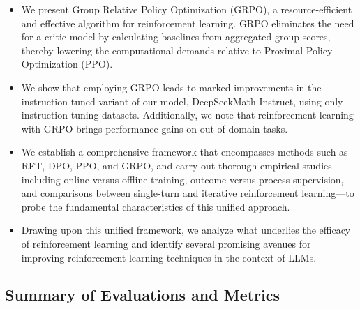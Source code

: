 \begin{itemize}[topsep=0pt]
    \item We present Group Relative Policy Optimization (GRPO), a resource-efficient and effective algorithm for reinforcement learning. GRPO eliminates the need for a critic model by calculating baselines from aggregated group scores, thereby lowering the computational demands relative to Proximal Policy Optimization (PPO).
    \item We show that employing GRPO leads to marked improvements in the instruction-tuned variant of our model, DeepSeekMath-Instruct, using only instruction-tuning datasets. Additionally, we note that reinforcement learning with GRPO brings performance gains on out-of-domain tasks.
    \item We establish a comprehensive framework that encompasses methods such as RFT, DPO, PPO, and GRPO, and carry out thorough empirical studies—including online versus offline training, outcome versus process supervision, and comparisons between single-turn and iterative reinforcement learning—to probe the fundamental characteristics of this unified approach.
    \item Drawing upon this unified framework, we analyze what underlies the efficacy of reinforcement learning and identify several promising avenues for improving reinforcement learning techniques in the context of LLMs.
\end{itemize}

\subsection{Summary of Evaluations and Metrics}

